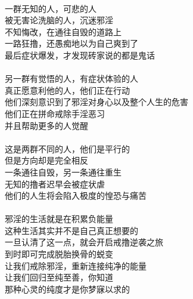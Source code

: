 \begin{poem}[自毁与重生的平行世界]
    \begin{multicols}{2}
        \centering~\\
        一群无知的人，可悲的人 \\ 被无害论洗脑的人，沉迷邪淫 \\ 不知悔改，在通往自毁的道路上 \\ 一路狂撸，还愚痴地以为自己爽到了 \\ 最后症状爆发，才发现砖家说的都是鬼话 \\~\\
        另一群有觉悟的人，有症状体验的人 \\ 真正愿意利他的人，他们正在行动 \\ 他们深刻意识到了邪淫对身心以及整个人生的危害 \\ 他们正在拼命戒除手淫恶习 \\ 并且帮助更多的人觉醒 \\~\\
        这是两群不同的人，他们是平行的 \\ 但是方向却是完全相反 \\ 一条通往自毁，另一条通往重生 \\ 无知的撸者迟早会被症状虐 \\ 他们的人生将会陷入极度的惶恐与痛苦 \\~\\
        邪淫的生活就是在积累负能量 \\ 这种生活其实并不是自己真正想要的 \\ 一旦认清了这一点，就会开启戒撸逆袭之旅 \\ 到时即可完成脱胎换骨的蜕变 \\ 让我们戒除邪淫，重新连接纯净的能量 \\ 让我们回归至纯至善，你知道 \\ 那种心灵的纯度才是你梦寐以求的
    \end{multicols}
\end{poem}

